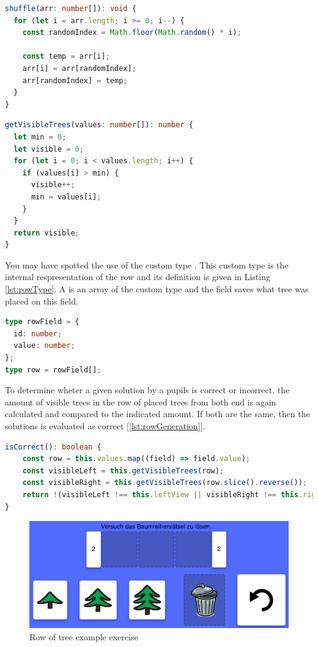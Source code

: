 \begin{lstlisting}[language=TypeScript,caption={Algorithm to shuffle an array},label={lst:shuffle}]
shuffle(arr: number[]): void {
  for (let i = arr.length; i >= 0; i--) {
    const randomIndex = Math.floor(Math.random() * i);

    const temp = arr[i];
    arr[i] = arr[randomIndex];
    arr[randomIndex] = temp;
  }
}
\end{lstlisting}

\begin{lstlisting}[language=TypeScript,caption={Algorithm to calculate the amount of visible tree from one end},label={lst:getVisibleTrees}]
getVisibleTrees(values: number[]): number {
  let min = 0;
  let visible = 0;
  for (let i = 0; i < values.length; i++) {
    if (values[i] > min) {
      visible++;
      min = values[i];
    }
  }
  return visible;
}
\end{lstlisting}

You may have spotted the use of the custom type . This custom type is the internal respresentation of the row and its definition is given in Listing \ref{lst:rowType}. A  is an array of the custom type  and the field  saves what tree was placed on this field.

\begin{lstlisting}[language=TypeScript,caption={Definition of the custom row and rowField type},label={lst:rowType}]
type rowField = {
  id: number;
  value: number;
};
type row = rowField[];
\end{lstlisting}

To determine wheter a given solution by a pupils is correct or incorrect, the amount of visible trees in the row of placed trees from both end is again calculated and compared to the indicated amount. If both are the same, then the solutions is evaluated as correct [\ref{lst:rowGeneration}].

\begin{lstlisting}[language=TypeScript,caption={Correctness check of a row of tree exercise solution},label={lst:rowCorrectness}]
isCorrect(): boolean {
    const row = this.values.map((field) => field.value);
    const visibleLeft = this.getVisibleTrees(row);
    const visibleRight = this.getVisibleTrees(row.slice().reverse());
    return !(visibleLeft !== this.leftView || visibleRight !== this.rightView);
}
\end{lstlisting}

\begin{figure} 
    \centering
    \includegraphics[width=0.4 \columnwidth]{figures/tree_row_example_exercise.png}
    \caption{Row of tree example exercise} 
    \label{fig:tree_row_example} 
\end{figure}

